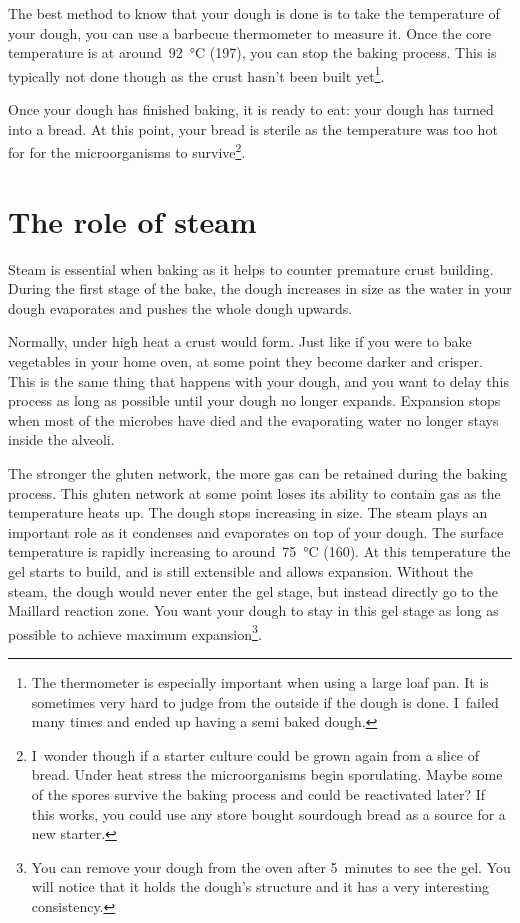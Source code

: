 The best method to know that your dough is done is to take
the temperature of your dough, you can use a barbecue thermometer
to measure it. Once the core temperature is at around~\qty{92}{\degreeCelsius}
(\qty{197}{\degF}),
you can stop the baking process. This is typically not done though
as the crust hasn't been built yet\footnote{The thermometer is
especially important when using a large loaf pan. It is sometimes
very hard to judge from the outside if the dough is done. I~failed
many times and ended up having a semi baked dough.}.

Once your dough has finished baking, it is ready to eat: your
dough has turned into a bread. At this
point, your bread is sterile as the temperature was too hot for
for the microorganisms to survive\footnote{I~wonder though
if a starter culture could be grown again from a slice of bread.
Under heat stress the microorganisms begin sporulating. Maybe
some of the spores survive the baking process and could be reactivated
later? If this works, you could use any store bought sourdough
bread as a source for a new starter.}.

\section{The role of steam}
Steam is essential when baking as it helps to counter premature
crust building. During the first stage of the bake, the dough
increases in size as the water in your dough evaporates and pushes
the whole dough upwards.

Normally, under high heat a crust would form. Just like
if you were to bake vegetables in your home oven, at some point
they become darker and crisper. This is the same thing that
happens with your dough, and you want to delay this process
as long as possible until your dough no longer expands.
Expansion stops when most of the microbes have died and
the evaporating water no longer stays inside the alveoli.

The stronger the gluten network, the more gas can be retained
during the baking process. This gluten network at some point
loses its ability to contain gas as the temperature heats
up. The dough stops increasing in size. The steam plays
an important role as it condenses and evaporates on top
of your dough. The surface temperature is rapidly increasing
to around~\qty{75}{\degreeCelsius} (\qty{160}{\degF}). At this temperature the
gel starts to build, and is still extensible and allows expansion.
Without the steam, the dough would never enter the gel stage,
but instead directly go to the Maillard reaction zone. You
want your dough to stay in this gel stage as long as possible
to achieve maximum expansion\footnote{You can remove your
dough from the oven after 5~minutes to see the gel. You will notice
that it holds the dough's structure and it has a very interesting consistency.}.

